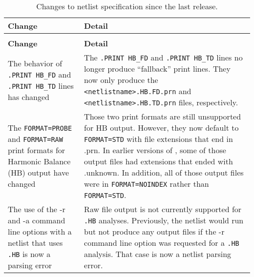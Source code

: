 



{
\small

\begin{longtable}[h] {>{\raggedright\small}m{2in}|>{\raggedright\let\\\tabularnewline\small}m{3.5in}}
  \caption{Changes to netlist specification since the last release.\label{newUsage}} \\ \hline
  \rowcolor{XyceDarkBlue}
  \color{white}\bf Change &
  \color{white}\bf Detail \\ \hline \endfirsthead
  \caption[]{Changes to netlist specification since the last release.\label{newUsage}} \\ \hline
  \rowcolor{XyceDarkBlue}
  \color{white}\bf Change &
  \color{white}\bf Detail \\ \hline \endhead

The behavior of \texttt{.PRINT HB\_FD} and \texttt{.PRINT HB\_TD} lines has changed & 
The \texttt{.PRINT HB\_FD} and \texttt{.PRINT HB\_TD} lines no longer produce
``fallback'' print lines.  They now only produce the \texttt{<netlistname>.HB.FD.prn} 
and \texttt{<netlistname>.HB.TD.prn} files, respectively. \\ \hline

The \texttt{FORMAT=PROBE} and \texttt{FORMAT=RAW} print formats for Harmonic
Balance (HB) output have changed & Those two print formats are still unsupported 
for HB output.  However, they now default to \texttt{FORMAT=STD} with file 
extensions that end in .prn. In earlier versions of \Xyce{}, some of those output 
files had extensions that ended with .unknown. In addition, all of those output 
files were in \texttt{FORMAT=NOINDEX} rather than \texttt{FORMAT=STD}.
\\ \hline

The use of the -r and -a command line options with a netlist that uses
\texttt{.HB} is now a parsing error &  Raw file output is not currently
supported for \texttt{.HB} analyses.  Previously, the \Xyce{} netlist 
would run but not produce any output files if the -r command line option 
was requested for a \texttt{.HB} analysis.  That case is now a netlist
parsing error.  \\ \hline


\end{longtable}}
